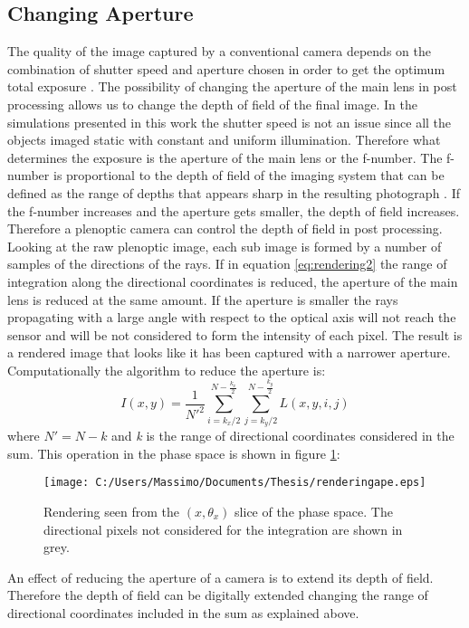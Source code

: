 \subsection{Changing Aperture}
The quality of the image captured by a conventional camera depends on the combination of shutter speed and aperture chosen in order to get the optimum total exposure \cite{pedrotti1993introduction}.
 The possibility of changing the aperture of the main lens in post processing allows us to change the depth of field of the final image. In the simulations presented in this work the shutter speed is not an issue since all the objects imaged static with constant and uniform illumination. Therefore what determines the exposure is the aperture of the main lens or the f-number. The f-number is proportional to the depth of field of the imaging system that can be defined as the range of depths that appears sharp in the resulting photograph \cite{ng2006digital}. If the f-number increases and the aperture gets smaller, the depth of field increases. Therefore a plenoptic camera can control the depth of field in post processing.
 Looking at the raw plenoptic image, each sub image is formed by a number of samples of the directions of the rays. If in equation \ref{eq:rendering2} the range of integration along the directional coordinates is reduced, the aperture of the main lens is reduced at the same amount. If the aperture is smaller the rays propagating with a large angle with respect to the optical axis will not reach the sensor and will be not considered to form the intensity of each pixel. The result is a rendered image that looks like it has been captured with a narrower aperture. Computationally the algorithm to reduce the aperture is:
 \begin{equation}
 	\label{eq:rendering4}
 	I(x,y) = \dfrac{1}{N'^2}\sum_{i=k_x/2}^{N-\frac{k_x}{2}}\sum_{j=k_{y}/2}^{N-\frac{k_y}{2}} L(x,y,i,j)
 \end{equation}
 where $N'=N-k$ and \textit{k} is the range of directional coordinates considered in the sum. This operation in the phase space is shown in figure \ref{fig:rendering4}:
 \begin{figure}[H]
 	\centering
 	\texttt{[image: C:/Users/Massimo/Documents/Thesis/renderingape.eps]}
 	\caption{\label{fig:rendering4} Rendering seen from the $(x,\theta_x)$ slice of the phase space. The directional pixels not considered for the integration are shown in grey. }
 \end{figure}
An effect of reducing the aperture of a camera is to extend its depth of field. Therefore the depth of field can be digitally extended changing the range of directional coordinates included in the sum as explained above.
